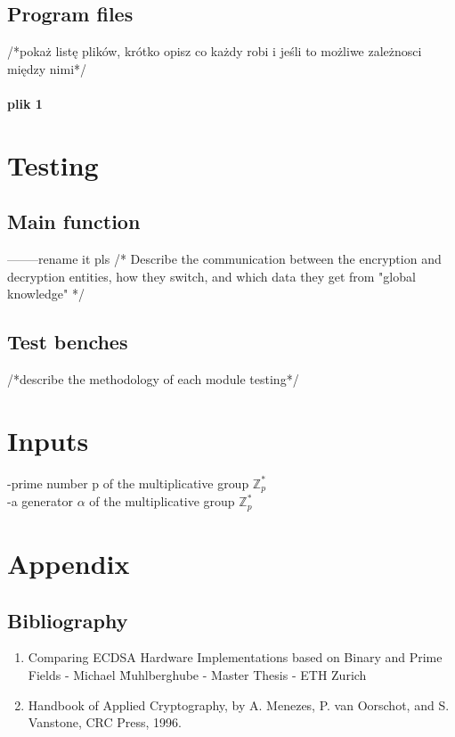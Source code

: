 \documentclass{report}
\begin{document}
\section{Program files}
/*pokaż listę plików, krótko opisz co każdy robi i jeśli to możliwe zależnosci między nimi*/
\subsubsection{plik 1}

\chapter{Testing}
\section{Main function} --------rename it pls
/*
Describe the communication between the encryption and decryption entities, how they switch, and which data they get from "global knowledge"
*/
\section{Test benches}
/*describe the methodology of each module testing*/
\chapter{Inputs}
-prime number p of the multiplicative group $\mathbb{Z}_p^* $\\
-a generator $\alpha$ of the multiplicative group $\mathbb{Z}_p^* $

\chapter{Appendix}
\section{Bibliography}
\begin{enumerate}
\item Comparing ECDSA Hardware Implementations based on Binary and Prime Fields - Michael M̈uhlberghube - Master Thesis - ETH Zurich
\item  Handbook of Applied Cryptography, by A. Menezes, P. van Oorschot, and S. Vanstone, CRC Press, 1996.
\end{enumerate}
\end{document}
